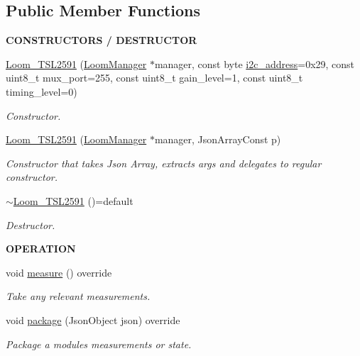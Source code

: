 \subsection*{Public Member Functions}
\begin{Indent}{\bf C\+O\+N\+S\+T\+R\+U\+C\+T\+O\+RS / D\+E\+S\+T\+R\+U\+C\+T\+OR}\par
\begin{DoxyCompactItemize}
\item 
\hyperlink{class_loom___t_s_l2591_a1998a0c80344f4aa3d27e020acf17860}{Loom\+\_\+\+T\+S\+L2591} (\hyperlink{class_loom_manager}{Loom\+Manager} $\ast$manager, const byte \hyperlink{class_loom_i2_c_sensor_a6ff389c1f015152a9ebfccb037d3d90e}{i2c\+\_\+address}=0x29, const uint8\+\_\+t mux\+\_\+port=255, const uint8\+\_\+t gain\+\_\+level=1, const uint8\+\_\+t timing\+\_\+level=0)
\begin{DoxyCompactList}\small\item\em Constructor. \end{DoxyCompactList}\item 
\hyperlink{class_loom___t_s_l2591_ac74ac9e73598e09768af7771ac940c9c}{Loom\+\_\+\+T\+S\+L2591} (\hyperlink{class_loom_manager}{Loom\+Manager} $\ast$manager, Json\+Array\+Const p)
\begin{DoxyCompactList}\small\item\em Constructor that takes Json Array, extracts args and delegates to regular constructor. \end{DoxyCompactList}\item 
\hyperlink{class_loom___t_s_l2591_af2700173e2e25592b1c58974dab80cdc}{$\sim$\+Loom\+\_\+\+T\+S\+L2591} ()=default
\begin{DoxyCompactList}\small\item\em Destructor. \end{DoxyCompactList}\end{DoxyCompactItemize}
\end{Indent}
\begin{Indent}{\bf O\+P\+E\+R\+A\+T\+I\+ON}\par
\begin{DoxyCompactItemize}
\item 
void \hyperlink{class_loom___t_s_l2591_a0830d70d8d094de204b6039947d8f309}{measure} () override
\begin{DoxyCompactList}\small\item\em Take any relevant measurements. \end{DoxyCompactList}\item 
void \hyperlink{class_loom___t_s_l2591_a02b3656a1bccbed969306141c1f06011}{package} (Json\+Object json) override
\begin{DoxyCompactList}\small\item\em Package a modules measurements or state. \end{DoxyCompactList}\end{DoxyCompactItemize}
\end{Indent}
